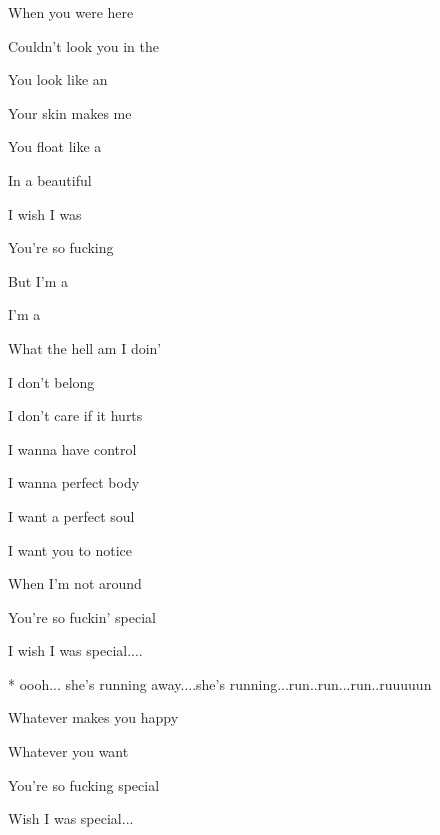 

\zs                   
When you were here 

Couldn't look you in the 

You look like an 

Your skin makes me 
\ks

\zs
You float like a 

In a beautiful 

I wish I was 

You're so fucking 
\ks

\zr
But I'm a  

I'm a 

What the hell am I doin' 

I don't belong 
\kr

\zs
I don't care if it hurts

I wanna have control

I wanna perfect body

I want a perfect soul
\ks

\zs
I want you to notice

When I'm not around

You're so fuckin' special

I wish I was special....
\ks

\zr  


* oooh... she's running away....she's running...run..run...run..ruuuuun
\kr

\zs
Whatever makes you happy

Whatever you want

You're so fucking special

Wish I was special...
\ks

\zr  \kr

\kp
